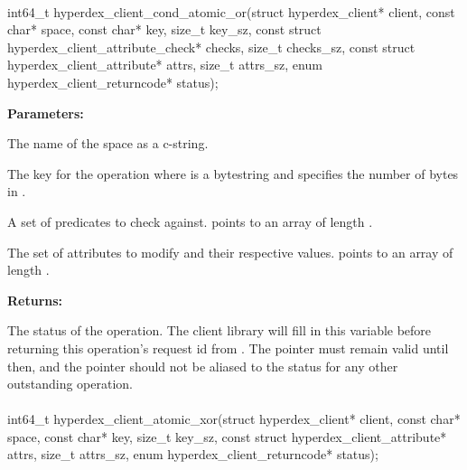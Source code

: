 \paragraph{}
\begin{ccode}
int64_t hyperdex_client_cond_atomic_or(struct hyperdex_client* client,
                const char* space,
                const char* key, size_t key_sz,
                const struct hyperdex_client_attribute_check* checks, size_t checks_sz,
                const struct hyperdex_client_attribute* attrs, size_t attrs_sz,
                enum hyperdex_client_returncode* status);
\end{ccode}
\funcdesc 

\noindent\textbf{Parameters:}
\begin{description}[labelindent=\widthof{{\code{checks}, \code{checks\_sz}}},leftmargin=*,noitemsep,nolistsep,align=right]
\item[\code{space}] The name of the space as a c-string.
\item[\code{key}, \code{key\_sz}] The key for the operation where  is a bytestring and  specifies the number of bytes in .
\item[\code{checks}, \code{checks\_sz}] A set of predicates to check against.   points to an array of length .
\item[\code{attrs}, \code{attrs\_sz}] The set of attributes to modify and their respective values.   points to an array of length .
\end{description}

\noindent\textbf{Returns:}
\begin{description}[labelindent=\widthof{{\code{status}}},leftmargin=*,noitemsep,nolistsep,align=right]
\item[\code{status}] The status of the operation.  The client library will fill in this variable before returning this operation's request id from .  The pointer must remain valid until then, and the pointer should not be aliased to the status for any other outstanding operation.
\end{description}

\paragraph{}
\begin{ccode}
int64_t hyperdex_client_atomic_xor(struct hyperdex_client* client,
                const char* space,
                const char* key, size_t key_sz,
                const struct hyperdex_client_attribute* attrs, size_t attrs_sz,
                enum hyperdex_client_returncode* status);
\end{ccode}
\funcdesc 

